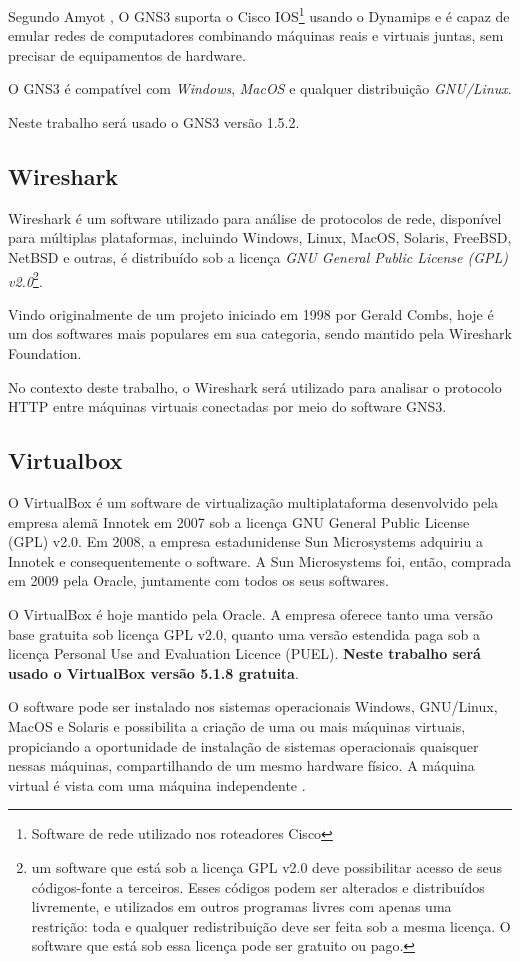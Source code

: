 Segundo Amyot \cite{amyot}, O GNS3 suporta o Cisco IOS\footnote{Software de rede utilizado nos roteadores Cisco} usando o Dynamips e é capaz de emular redes de computadores combinando máquinas reais e virtuais juntas, sem precisar de equipamentos de hardware.

O GNS3 é compatível com \textit{Windows}, \textit{MacOS} e qualquer distribuição \textit{GNU/Linux}.

Neste trabalho será usado o GNS3 versão 1.5.2.

\subsection{Wireshark}

Wireshark é um software utilizado para análise de protocolos de rede, disponível para múltiplas plataformas, incluindo Windows, Linux, MacOS, Solaris, FreeBSD, NetBSD e outras, é distribuído sob a licença \textit{GNU General Public License (GPL) v2.0}\footnote{um software que está sob a licença GPL v2.0 deve possibilitar acesso de seus códigos-fonte a terceiros. Esses códigos podem ser alterados e distribuídos livremente, e utilizados em outros programas livres com apenas uma restrição: toda e qualquer redistribuição deve ser feita sob a mesma licença. O software que está sob essa licença pode ser gratuito ou pago.}.

Vindo originalmente de um projeto iniciado em 1998 por Gerald Combs, hoje é um dos softwares mais populares em sua categoria, sendo mantido pela Wireshark Foundation.

No contexto deste trabalho, o Wireshark será utilizado para analisar o protocolo HTTP entre máquinas virtuais conectadas por meio do software GNS3.

\subsection{Virtualbox}

O VirtualBox é um software de virtualização multiplataforma desenvolvido pela empresa alemã Innotek em 2007 sob a licença GNU General Public License (GPL) v2.0. Em 2008, a empresa estadunidense Sun Microsystems adquiriu a Innotek e consequentemente o software. A Sun Microsystems foi, então, comprada em 2009 pela Oracle, juntamente com todos os seus softwares. 	

O VirtualBox é hoje mantido pela Oracle. A empresa oferece tanto uma versão base gratuita sob licença GPL v2.0, quanto uma versão estendida paga sob a licença Personal Use and Evaluation Licence (PUEL). \textbf{Neste trabalho será usado o VirtualBox versão 5.1.8 gratuita}.

O software pode ser instalado nos sistemas operacionais Windows, GNU/Linux, MacOS e Solaris e possibilita a criação de uma ou mais máquinas virtuais, propiciando a oportunidade de instalação de sistemas operacionais quaisquer nessas máquinas, compartilhando de um mesmo hardware físico. A máquina virtual é vista com uma máquina independente \cite{VirtualBox}.





